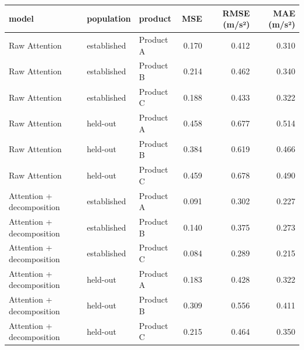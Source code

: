 \begin{tabular}{lllrrr}
\toprule
model & population & product & MSE & RMSE (m/s²) & MAE (m/s²) \\
\midrule
Raw Attention & established & Product A & 0.170 & 0.412 & 0.310 \\
Raw Attention & established & Product B & 0.214 & 0.462 & 0.340 \\
Raw Attention & established & Product C & 0.188 & 0.433 & 0.322 \\
Raw Attention & held-out & Product A & 0.458 & 0.677 & 0.514 \\
Raw Attention & held-out & Product B & 0.384 & 0.619 & 0.466 \\
Raw Attention & held-out & Product C & 0.459 & 0.678 & 0.490 \\
Attention + decomposition & established & Product A & 0.091 & 0.302 & 0.227 \\
Attention + decomposition & established & Product B & 0.140 & 0.375 & 0.273 \\
Attention + decomposition & established & Product C & 0.084 & 0.289 & 0.215 \\
Attention + decomposition & held-out & Product A & 0.183 & 0.428 & 0.322 \\
Attention + decomposition & held-out & Product B & 0.309 & 0.556 & 0.411 \\
Attention + decomposition & held-out & Product C & 0.215 & 0.464 & 0.350 \\
\bottomrule
\end{tabular}
